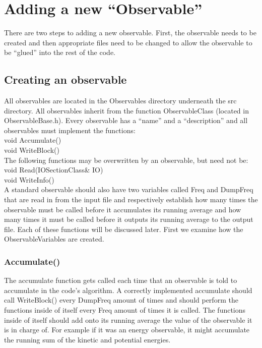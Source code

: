 \documentclass{book}
\begin{document}
\section{Adding a new ``Observable''}
There are two steps to adding a new observable. First, the observable
needs to be created and then appropriate files need to be changed to
allow the observable to be ``glued'' into the rest of the code.
\subsection{Creating an observable}
All observables are located in the Observables directory underneath
the src directory. All observables inherit from the function
ObservableClass (located in ObservableBase.h). Every observable has a
``name'' and a ``description'' and all
observables must implement the functions: \\
void Accumulate() \\
void WriteBlock() \\ 
The following functions may be overwritten by an observable, but need
not be: \\
void Read(IOSectionClass& IO) \\
void WriteInfo() \\
A standard observable should also have two variables called Freq and
DumpFreq that are read in from the input file and respectively
establish how many times the observable must be called before it
accumulates its running average and how many times it must be called
before it outputs its running average to the output file.
Each of these functions will be discussed later.  First we examine how
the ObservableVariables are created.
\subsubsection{Accumulate()}
The accumulate function gets called each time that an observable is
told to accumulate in the code's algorithm.  A correctly implemented
accumulate should call WriteBlock() every DumpFreq amount of times and
should perform the functions inside of itself every Freq amount of
times it is called.  The functions inside of itself should add onto
its running average the value of the observable it is in charge
of. For example if it was an energy observable, it might accumulate
the running sum of the kinetic and potential energies.
\end{document}
